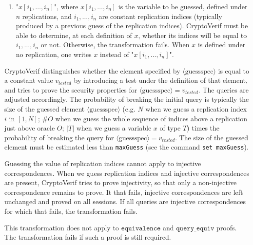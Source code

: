 \documentclass{article}
\newcommand{\nonterm}[1]{\langle\textrm{#1}\rangle}
\begin{document}
\begin{itemize}
\begin{enumerate}
  \item $\texttt{"}x[i_1, \dots, i_n]\texttt{"}$, where $x[i_1, \dots, i_n]$
    is the variable to be guessed, defined under $n$
    replications, and $i_1, \dots, i_n$ are constant replication
    indices (typically produced by a previous guess of the replication
    indices).
    CryptoVerif must be able to determine, at each definition of $x$, whether its indices
    will be equal to $i_1, \dots, i_n$ or not. Otherwise, the transformation fails.
    When $x$ is defined under no replication, one writes $x$ instead of $\texttt{"}x[i_1, \dots, i_n]\texttt{"}$.

  \end{enumerate}
    CryptoVerif distinguishes whether the element specified by  $\nonterm{guessspec}$
is equal to a constant value $v_{\mathit{tested}}$ by introducing a test 
under the definition of that element, and tries to prove the
security properties for $\nonterm{guessspec} = v_{\mathit{tested}}$.
The queries are adjusted accordingly. The probability of breaking
the initial query is typically the size of the guessed element $\nonterm{guessspec}$
(e.g. $N$ when we guess a replication index $i$ in $[1,N]$;
$\#O$ when we guess the whole sequence of indices above a replication just above oracle $O$;
$|T|$ when we guess a variable $x$ of type $T$)
times the probability of
breaking the query for $\nonterm{guessspec} = v_{\mathit{tested}}$.
The size of the guessed element must be estimated less than \texttt{maxGuess}
(see the command \texttt{set maxGuess}).

Guessing the value of replication indices cannot apply to injective
correspondences.  When we guess replication indices and injective
correspondences are present, CryptoVerif tries to prove injectivity,
so that only a non-injective correspondence remains to prove.  It that fails,
injective correspondences are left unchanged and proved on all sessions. If
all queries are injective correspondences for which that fails, the
transformation fails.

This transformation does not apply to $\texttt{equivalence}$
and $\texttt{query\_equiv}$ proofs. The transformation fails
if such a proof is still required.


\end{itemize}
\end{document}
